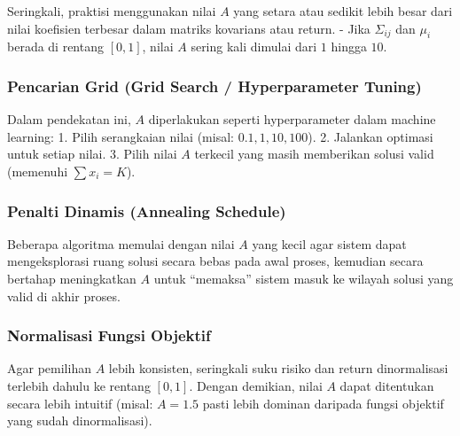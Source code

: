 Seringkali, praktisi menggunakan nilai \(A\) yang setara atau sedikit lebih besar dari nilai koefisien terbesar dalam matriks kovarians atau return. - Jika \(\Sigma_{ij}\) dan \(\mu_i\) berada di rentang \([0, 1]\), nilai \(A\) sering kali dimulai dari \(1\) hingga \(10\).

\hypertarget{c.-pencarian-grid-grid-search-hyperparameter-tuning}{%
\subsubsection{Pencarian Grid (Grid Search / Hyperparameter Tuning)}\label{c.-pencarian-grid-grid-search-hyperparameter-tuning}}

Dalam pendekatan ini, \(A\) diperlakukan seperti hyperparameter dalam machine learning: 1. Pilih serangkaian nilai (misal: \(0.1, 1, 10, 100\)). 2. Jalankan optimasi untuk setiap nilai. 3. Pilih nilai \(A\) terkecil yang masih memberikan solusi valid (memenuhi \(\sum x_i = K\)).

\hypertarget{d.-penalti-dinamis-annealing-schedule}{%
\subsubsection{Penalti Dinamis (Annealing Schedule)}\label{d.-penalti-dinamis-annealing-schedule}}

Beberapa algoritma memulai dengan nilai \(A\) yang kecil agar sistem dapat mengeksplorasi ruang solusi secara bebas pada awal proses, kemudian secara bertahap meningkatkan \(A\) untuk ``memaksa'' sistem masuk ke wilayah solusi yang valid di akhir proses.

\hypertarget{e.-normalisasi-fungsi-objektif}{%
\subsubsection{Normalisasi Fungsi Objektif}\label{e.-normalisasi-fungsi-objektif}}

Agar pemilihan \(A\) lebih konsisten, seringkali suku risiko dan return dinormalisasi terlebih dahulu ke rentang \([0, 1]\). Dengan demikian, nilai \(A\) dapat ditentukan secara lebih intuitif (misal: \(A=1.5\) pasti lebih dominan daripada fungsi objektif yang sudah dinormalisasi).

